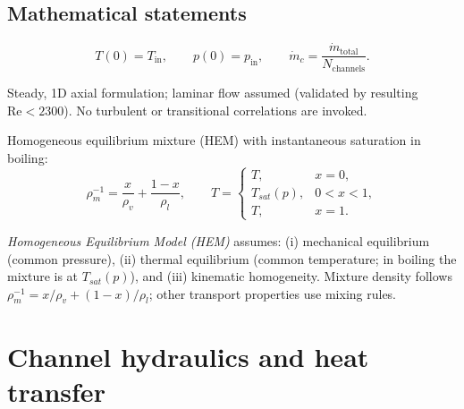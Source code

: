\documentclass[11pt,a4paper]{article}
\begin{document}
\subsection*{Mathematical statements}
\begin{description}[leftmargin=3.2cm,labelsep=0.6cm,style=nextline]
  \item[Inlet state]\vspace{-0.3em}
  \[
    T(0)=T_{\text{in}},\qquad p(0)=p_{\text{in}},\qquad \dot m_c=\frac{\dot m_{\text{total}}}{N_{\text{channels}}}.
  \]
  \medskip

  \item[Domain and regime] Steady, 1D axial formulation; laminar flow assumed (validated by resulting \(\mathrm{Re}<2300\)). No turbulent or transitional correlations are invoked.
  \medskip

  \item[Two-phase model]\vspace{-0.3em}
  Homogeneous equilibrium mixture (HEM) with instantaneous saturation in boiling:
  \[
    \rho_m^{-1}=\frac{x}{\rho_v}+\frac{1-x}{\rho_l},\qquad T=\begin{cases}
      T, & x=0,\\[2pt]
      T_{sat}(p), & 0<x<1,\\[2pt]
      T, & x=1.
    \end{cases}
  \]
  
  \begin{tcolorbox}[colback=blue!2!white,colframe=blue!40!black,title=What HEM assumes,left=1mm,right=1mm,top=0.4mm,bottom=0.4mm]
	  	\textit{Homogeneous Equilibrium Model (HEM)} assumes: (i) mechanical equilibrium (common pressure), (ii) thermal equilibrium (common temperature; in boiling the mixture is at \(T_{sat}(p)\)), and (iii) kinematic homogeneity. Mixture density follows \(\rho_m^{-1}=x/\rho_v+(1-x)/\rho_l\); other transport properties use mixing rules.
  \end{tcolorbox}
  \medskip

\end{description}

\section{Channel hydraulics and heat transfer}\label{sec:hydroHT}
\end{document}
